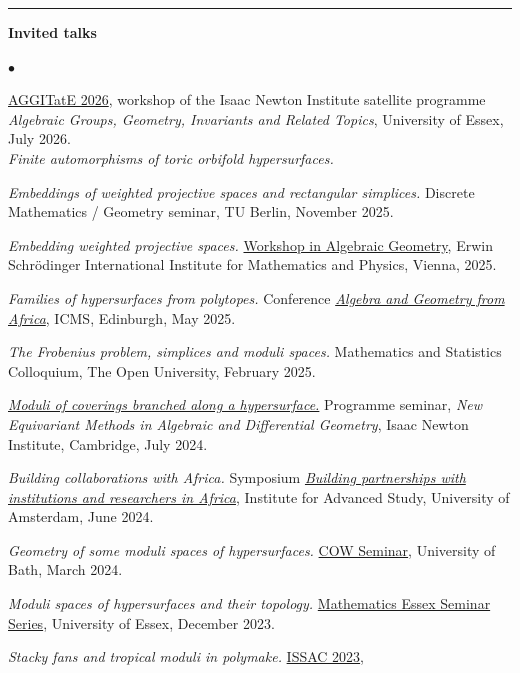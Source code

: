 \documentclass[10pt]{article}
\newcommand{\cvsection}[1]{%
  \par\vspace{0.24cm}%
  \noindent\rule{\textwidth}{0.4pt}%
  \par\vspace{0.12cm}%
  \noindent\textbf{\large #1}%
  \par\vspace{0.12cm}%
}
\newenvironment{cvlist}%
  {\begin{list}{$\bullet$}{%
     \setlength{\leftmargin}{1.1em}\setlength{\labelwidth}{0.8em}%
     \setlength{\itemsep}{0.12cm}\setlength{\parsep}{0pt}%
     \setlength{\topsep}{0pt}\setlength{\partopsep}{0pt}}}%
  {\end{list}}
\begin{document}
\cvsection{Invited talks}
\begin{cvlist}
\item \href{https://www.newton.ac.uk/event/ggiw02/}{AGGITatE 2026}, workshop of the
Isaac Newton Institute satellite programme {\em Algebraic Groups, Geometry,
Invariants and Related Topics}, University of Essex, July 2026.\\
\emph{Finite automorphisms of toric orbifold hypersurfaces.}
\item \emph{Embeddings of weighted projective spaces and rectangular simplices.}
Discrete Mathematics / Geometry seminar, TU Berlin, November 2025.
\item \emph{Embedding weighted projective spaces.}
\href{https://homepage.univie.ac.at/balazs.szendroi/?page_id=783}{Workshop in Algebraic Geometry},
Erwin Schr\"odinger International Institute for Mathematics and Physics,
Vienna, 2025.
\item \emph{Families of hypersurfaces from polytopes.} Conference
\href{https://icms.ac.uk/activities/workshop/algebra-and-geometry-from-africa/}{\em Algebra and Geometry from Africa},
ICMS, Edinburgh, May 2025.
\item \emph{The Frobenius problem, simplices and moduli spaces.}
Mathematics and Statistics Colloquium, The Open University, February 2025.
\item \href{https://www.youtube.com/watch?v=7kdnNRKsQLM}{\em Moduli of coverings branched along a hypersurface.}
Programme seminar, {\em New Equivariant Methods in Algebraic and Differential
Geometry}, Isaac Newton Institute, Cambridge, July 2024.
\item \emph{Building collaborations with Africa.} Symposium
\href{https://ias.uva.nl/content/events/2024/06/africa-symposium.html}{\em Building partnerships with institutions and researchers in Africa},
Institute for Advanced Study, University of Amsterdam, June 2024.
\item \emph{Geometry of some moduli spaces of hypersurfaces.}
\href{https://cow.alggeo.xyz/cow2023}{COW Seminar}, University of Bath, March 2024.
\item \emph{Moduli spaces of hypersurfaces and their topology.}
\href{https://researchseminars.org/talk/EssexMaths/97/}{Mathematics Essex Seminar Series},
University of Essex, December 2023.
\item \emph{Stacky fans and tropical moduli in polymake.}
\href{https://www.issac-conference.org/2023/program.php}{ISSAC 2023},

\end{cvlist}
\end{document}
